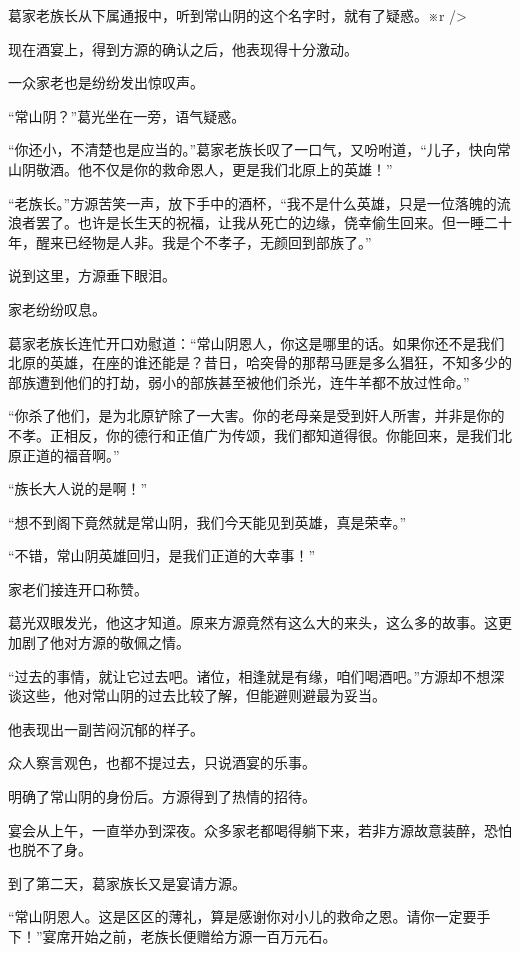 
\begin{this_body}

葛家老族长从下属通报中，听到常山阴的这个名字时，就有了疑惑。※r />

现在酒宴上，得到方源的确认之后，他表现得十分激动。

一众家老也是纷纷发出惊叹声。

“常山阴？”葛光坐在一旁，语气疑惑。

“你还小，不清楚也是应当的。”葛家老族长叹了一口气，又吩咐道，“儿子，快向常山阴敬酒。他不仅是你的救命恩人，更是我们北原上的英雄！”

“老族长。”方源苦笑一声，放下手中的酒杯，“我不是什么英雄，只是一位落魄的流浪者罢了。也许是长生天的祝福，让我从死亡的边缘，侥幸偷生回来。但一睡二十年，醒来已经物是人非。我是个不孝子，无颜回到部族了。”

说到这里，方源垂下眼泪。

家老纷纷叹息。

葛家老族长连忙开口劝慰道：“常山阴恩人，你这是哪里的话。如果你还不是我们北原的英雄，在座的谁还能是？昔日，哈突骨的那帮马匪是多么猖狂，不知多少的部族遭到他们的打劫，弱小的部族甚至被他们杀光，连牛羊都不放过性命。”

“你杀了他们，是为北原铲除了一大害。你的老母亲是受到奸人所害，并非是你的不孝。正相反，你的德行和正值广为传颂，我们都知道得很。你能回来，是我们北原正道的福音啊。”

“族长大人说的是啊！”

“想不到阁下竟然就是常山阴，我们今天能见到英雄，真是荣幸。”

“不错，常山阴英雄回归，是我们正道的大幸事！”

家老们接连开口称赞。

葛光双眼发光，他这才知道。原来方源竟然有这么大的来头，这么多的故事。这更加剧了他对方源的敬佩之情。

“过去的事情，就让它过去吧。诸位，相逢就是有缘，咱们喝酒吧。”方源却不想深谈这些，他对常山阴的过去比较了解，但能避则避最为妥当。

他表现出一副苦闷沉郁的样子。

众人察言观色，也都不提过去，只说酒宴的乐事。

明确了常山阴的身份后。方源得到了热情的招待。

宴会从上午，一直举办到深夜。众多家老都喝得躺下来，若非方源故意装醉，恐怕也脱不了身。

到了第二天，葛家族长又是宴请方源。

“常山阴恩人。这是区区的薄礼，算是感谢你对小儿的救命之恩。请你一定要手下！”宴席开始之前，老族长便赠给方源一百万元石。


\end{this_body}
